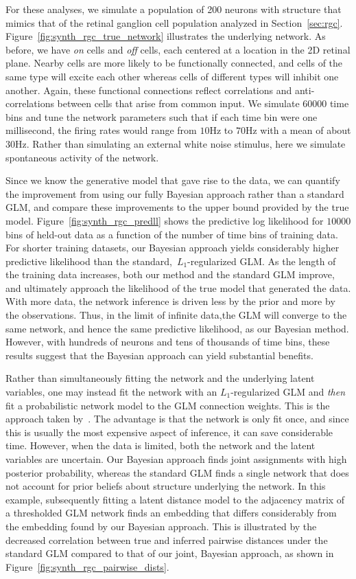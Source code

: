 For these analyses, we simulate a population of 200 neurons with
structure that mimics that of the retinal ganglion cell population
analyzed in
Section~\ref{sec:rgc}. Figure~\ref{fig:synth_rgc_true_network}
illustrates the underlying network. As before, we have \textit{on}
cells and \textit{off} cells, each centered at a location in the 2D
retinal plane. Nearby cells are more likely to be functionally
connected, and cells of the same type will excite each other whereas
cells of different types will inhibit one another. Again, these
functional connections reflect correlations and anti-correlations
between cells that arise from common input. We simulate $60000$ time
bins and tune the network parameters such that if each time bin were
one millisecond, the firing rates would range from $10$Hz to $70$Hz with a
mean of about $30$Hz.  Rather than simulating an external white noise
stimulus, here we simulate spontaneous activity of the network.

Since we know the generative model that gave rise to the data, we can
quantify the improvement from using our fully Bayesian approach
rather than a standard GLM, and compare these improvements to the
upper bound provided by the true model. Figure~\ref{fig:synth_rgc_predll}
shows the predictive log likelihood for $10000$ bins of held-out data as
a function of the number of time bins of training data. For shorter
training datasets, our Bayesian approach yields considerably higher
predictive likelihood than the standard,~$L_1$-regularized GLM. As
the length of the training data increases, both our method and
the standard GLM improve, and ultimately approach the likelihood of
the true model that generated the data. With more data, the network
inference is driven less by the prior and more by the observations.
Thus, in the limit of infinite data,the GLM will converge to the same
network, and hence the same predictive likelihood, as our Bayesian method.
However, with hundreds of neurons and tens of thousands of time bins,
these results suggest that the Bayesian approach can yield substantial
benefits.

Rather than simultaneously fitting the network and the underlying
latent variables, one may instead fit the network with an
$L_1$-regularized GLM and \textit{then} fit a probabilistic network
model to the GLM connection weights. This is the approach taken
by~\citet{stevenson2009bayesian}.  The advantage is that the network
is only fit once, and since this is usually the most expensive aspect
of inference, it can save considerable time. However, when the data is
limited, both the network and the latent variables are uncertain.  Our
Bayesian approach finds joint assignments with high posterior
probability, whereas the standard GLM finds a single network that does
not account for prior beliefs about structure underlying the network.
In this example, subsequently fitting a latent distance model to the
adjacency matrix of a thresholded GLM network finds an embedding that
differs considerably from the embedding found by our Bayesian
approach. This is illustrated by the decreased correlation between
true and inferred pairwise distances under the standard GLM compared
to that of our joint, Bayesian approach, as shown in
Figure~\ref{fig:synth_rgc_pairwise_dists}.

